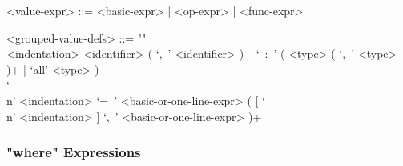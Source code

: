 \documentclass{article}
\begin{document}
\begin{itemize}
\begin{grammar}
<value-expr> ::= <basic-expr> | <op-expr> | <func-expr> 

<grouped-value-defs> ::= ""\\
<indentation> <identifier> ( `,\ ' <identifier> )+ `\ :\ '
( <type> ( `,\ ' <type> )+ | `all' <type> ) \\
`\\n' <indentation> `=\ '
<basic-or-one-line-expr> ( [ `\\n' <indentation> ] `,\ ' <basic-or-one-line-expr> )+
\end{grammar}

\end{itemize}

\subsubsection{"where" Expressions}
\end{document}
